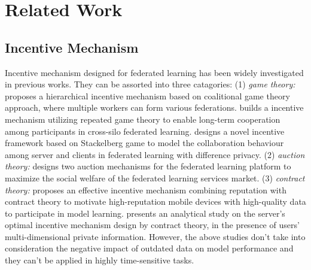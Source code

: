 \documentclass{article}
\theoremstyle{plain}
\theoremstyle{definition}
\theoremstyle{remark}
\begin{document}

\section{Related Work}
\label{Related Work}
\subsection{Incentive Mechanism}
Incentive mechanism designed for federated learning has been widely investigated in previous works.
They can be assorted into three catagories:
(1) \textit{game theory:} 
\cite{lim2020hierarchical}  proposes a hierarchical incentive mechanism based on coalitional game theory approach, where multiple workers can form various federations.
\cite{zhang2022enabling} builds a incentive mechanism utilizing repeated game theory to enable long-term cooperation among participants in cross-silo federated learning.
\cite{huang2024collaboration} designs a novel incentive framework based on Stackelberg game to model the collaboration behaviour among server and clients in federated learning with difference privacy.
(2) \textit{auction theory:} 
\cite{jiao2020toward} designs two auction mechanisms for the federated learning platform to maximize the social welfare of the federated learning services market.
(3) \textit{contract theory:} 
\cite{kang2019incentive} proposes an effective incentive mechanism combining reputation with contract theory to motivate high-reputation mobile devices with high-quality data to participate in model learning.
\cite{ding2020optimal} presents an analytical study on the server's optimal incentive mechanism design by contract theory, in the presence of users' multi-dimensional private information.
However, the above studies don't take into consideration the negative impact of outdated data on model performance and they can't be applied in highly time-sensitive tasks.
\end{document}
